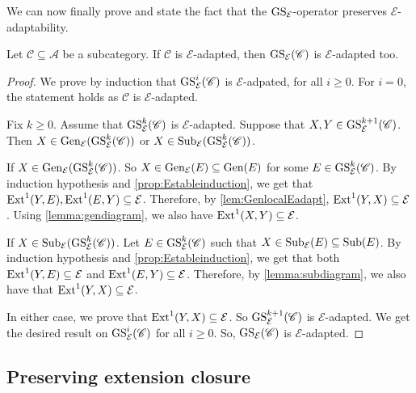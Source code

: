 We can now finally prove and state the fact that the $\operatorname{GS}_\mathcal{E}$-operator preserves $\mathcal{E}$-adaptability.

\begin{prop}
\label{prop:EAdapt}
Let $\mathscr{C} \subseteq \mathscr{A}$ be a subcategory. If $\mathscr{C}$ is $\mathcal{E}$-adapted, then $\operatorname{GS}_{\mathcal{E}}(\mathscr{C})$ is $\mathcal{E}$-adapted too.
\end{prop}

\begin{proof}
We prove by induction that $\operatorname{GS}^{i}_{\mathcal{E}}(\mathscr{C})$ is ${\mathcal{E}}$-adpated, for all $i \geq 0$. For $i=0$, the statement holds as $\mathcal{C}$ is $\mathcal{E}$-adapted.

Fix $k \geqslant 0$. Assume that  $\operatorname{GS}^{k}_{\mathcal{E}}(\mathscr{C})$ is ${\mathcal{E}}$-adapted. Suppose that $X,Y \in \operatorname{GS}^{k+1}_{\mathcal{E}}(\mathscr{C})$. Then $X \in \operatorname{Gen}_{\mathcal{E}}(\operatorname{GS}^{k}_{\mathcal{E}}(\mathscr{C}))$ or $X \in \operatorname{Sub}_{\mathcal{E}}(\operatorname{GS}^{k}_{\mathcal{E}}(\mathscr{C}))$.

If $X \in \operatorname{Gen}_{\mathcal{E}}(\operatorname{GS}^{k}_{\mathcal{E}}(\mathscr{C}))$. So $X \in \operatorname{Gen}_{\mathcal{E}}(E) \subseteq \operatorname{Gen}(E)$ for some $E \in \operatorname{GS}^{k}_{\mathcal{E}}(\mathscr{C})$. By induction hypothesis and \cref{prop:Estableinduction}, we get that $\operatorname{Ext}^1(Y,E),\operatorname{Ext}^1(E,Y) \subseteq \mathcal{E}$. Therefore, by \cref{lem:GenlocalEadapt}, $\operatorname{Ext}^1(Y,X) \subseteq \mathcal{E}$. Using \cref{lemma:gendiagram}, we also have $\operatorname{Ext}^1(X,Y) \subseteq \mathcal{E}$.

If $X \in \operatorname{Sub}_{\mathcal{E}}(\operatorname{GS}^{k}_{\mathcal{E}}(\mathscr{C}))$. Let $E \in \operatorname{GS}^{k}_{\mathcal{E}}(\mathscr{C})$ such that $X \in \operatorname{Sub}_{\mathcal{E}}(E) \subseteq \operatorname{Sub}(E)$. By induction hypothesis and \cref{prop:Estableinduction}, we get that both $\operatorname{Ext}^1(Y,E) \subseteq \mathcal{E}$ and $\operatorname{Ext}^1(E,Y) \subseteq \mathcal{E}$. Therefore, by \cref{lemma:subdiagram}, we also have that $\operatorname{Ext}^1(Y,X) \subseteq \mathcal{E}$.

In either case, we prove that $\operatorname{Ext}^1(Y,X) \subseteq \mathcal{E}$. So $\operatorname{GS}^{k+1}_{\mathcal{E}}(\mathscr{C})$ is $\mathcal{E}$-adapted. We get the desired result on $\operatorname{GS}^{i}_{\mathcal{E}}(\mathscr{C})$ for all $i \geq 0$. So, $\operatorname{GS}_{\mathcal{E}}(\mathscr{C})$ is  $\mathcal{E}$-adapted.
\end{proof}

\subsection{Preserving extension closure}
\label{ss:Extclosedpreserv}

